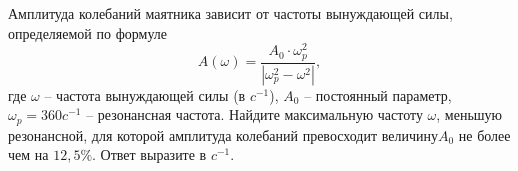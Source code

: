 \begin{ex}
	\begin{condition}
		Амплитуда колебаний маятника зависит от частоты вынуждающей силы, определяемой по формуле
		\[ A(\omega)=\dfrac{A_0\cdot\omega _p ^2}{|\omega _p ^2-\omega^2|}, \]
		где \( \omega \) – частота вынуждающей силы (в \( c^{-1} \)), \( A_0 \) – постоянный параметр, \( \omega_p = 360c^{-1}\) – резонансная частота. Найдите максимальную частоту \( \omega  \), меньшую резонансной, для которой амплитуда колебаний превосходит величину\(  A_0  \) не более чем на \( 12,5\% \). Ответ выразите в \( c^{-1} \).
	\end{condition}
\end{ex}